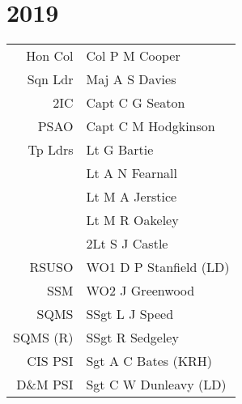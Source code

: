 \chapter*{2019}

\begin{center}
  \small
  \begin{tabular}{rl}
    Hon Col & Col P M Cooper \\
    Sqn Ldr & Maj A S Davies \\
    2IC & Capt C G Seaton \\
    PSAO & Capt C M Hodgkinson \\
    Tp Ldrs & Lt G Bartie \\
     & Lt A N Fearnall \\
     & Lt M A Jerstice \\
     & Lt M R Oakeley \\
     & 2Lt S J Castle \\
    RSUSO & WO1 D P Stanfield (LD) \\
    SSM & WO2 J Greenwood \\
    SQMS & SSgt L J Speed \\
    SQMS (R) & SSgt R Sedgeley \\
    CIS PSI & Sgt A C Bates (KRH) \\
    D\&M PSI & Sgt C W Dunleavy (LD) \\
  \end{tabular}
\end{center}


